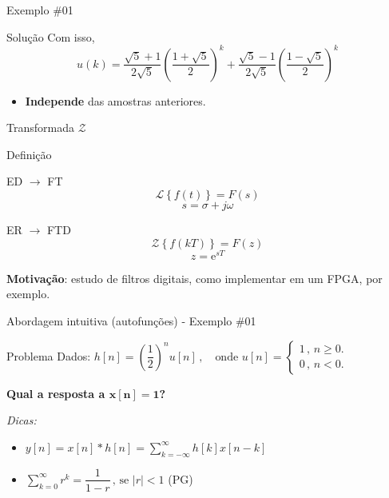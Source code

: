 \begin{frame}{Exemplo \#01}
\begin{block}{Solução}
Com isso,
$$\boxed{u(k) = \dfrac{\sqrt{5} + 1}{2\sqrt{5}}\left(\dfrac{1 + \sqrt{5}}{2}\right)^k + \dfrac{\sqrt{5} - 1}{2\sqrt{5}}\left(\dfrac{1 - \sqrt{5}}{2}\right)^k}$$
\begin{itemize}
    \item \textbf{Independe} das amostras anteriores.
\end{itemize}
\end{block}
\end{frame}

\begin{frame}{Transformada $ \mathcal{Z} $}
\begin{block}{Definição}
	
\begin{minipage}{0.45\linewidth}
	\centering
	
	ED $ \rightarrow $ FT
	\[ \mathcal{L}\left\lbrace f(t) \right\rbrace=F(s) \]
	\[ s=\sigma+j\omega \]
\end{minipage}
\hfill
\begin{minipage}{0.45\linewidth}
	\centering
	
	ER $ \rightarrow $ FTD
	\[ \mathcal{Z}\left\lbrace f(kT) \right\rbrace=F(z) \]
	\[ z=\text{e}^{sT} \]
\end{minipage}

\vspace{0.5cm}

\textbf{Motivação}: estudo de filtros digitais, como implementar em um FPGA, por exemplo.

\end{block}
\end{frame}

\begin{frame}{Abordagem intuitiva (autofunções) - Exemplo \#01}
	\begin{center}
		\scalebox{1}{}
	\end{center}
	
	\begin{block}{Problema}
		Dados: $ h[n]=\left( \dfrac{1}{2}\right)^{n}u[n]\, ,\quad \text{onde } u[n]=\begin{cases}
		1\, ,\, n\geqslant0.\\
		0\, ,\, n<0.
		\end{cases}  $
		
		\vspace{0.2cm}
		
		\textbf{Qual a resposta a $ \bm{x[n]=1} $?}
		
		\vspace{0.5cm}
		
		\textit{Dicas:}
		\begin{itemize}
			\item $ y[n]=x[n] * h[n]=\displaystyle\sum_{k=-\infty}^{\infty}h[k]x[n-k] $
			\item $ \displaystyle\sum_{k=0}^{\infty}r^{k}=\dfrac{1}{1-r}\, ,\, \text{se }|r|<1 $ (PG)
		\end{itemize}
	\end{block}
	
\end{frame}

